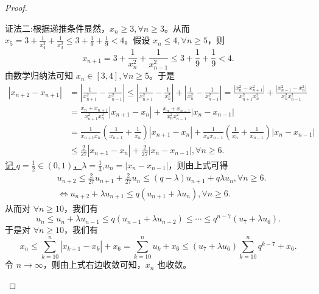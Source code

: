 \documentclass[../../main.tex]{subfiles}%
\begin{document}
\begin{proof}
\begin{enumerate}
{\color{blue}证法二:}根据递推条件显然，\(x_n\geqslant 3,\forall n\geqslant 3\)。从而 \(x_5 = 3+\frac{1}{x_{4}^{2}}+\frac{1}{x_{3}^{2}}\leqslant 3+\frac{1}{9}+\frac{1}{9}<4\)。假设 \(x_n\leqslant 4,\forall n\geqslant 5\)，则
\[
x_{n + 1}=3+\frac{1}{x_{n}^{2}}+\frac{1}{x_{n - 1}^{2}}\leqslant 3+\frac{1}{9}+\frac{1}{9}<4.
\]
由数学归纳法可知 \(x_n\in [3,4],\forall n\geqslant 5\)。于是
\begin{align*}
\left| x_{n+2}-x_{n+1} \right|&=\left| \frac{1}{x_{n+1}^{2}}-\frac{1}{x_{n-1}^{2}} \right|\leqslant \left| \frac{1}{x_{n+1}^{2}}-\frac{1}{x_{n}^{2}} \right|+\left| \frac{1}{x_{n}^{2}}-\frac{1}{x_{n-1}^{2}} \right|=\frac{\left| x_{n}^{2}-x_{n+1}^{2} \right|}{x_{n+1}^{2}x_{n}^{2}}+\frac{\left| x_{n-1}^{2}-x_{n}^{2} \right|}{x_{n}^{2}x_{n-1}^{2}}
\\
&=\frac{x_n+x_{n+1}}{x_{n+1}^{2}x_{n}^{2}}\left| x_{n+1}-x_n \right|+\frac{x_n+x_{n-1}}{x_{n}^{2}x_{n-1}^{2}}\left| x_n-x_{n-1} \right|
\\
&=\frac{1}{x_{n+1}x_n}\left( \frac{1}{x_{n+1}}+\frac{1}{x_n} \right) \left| x_{n+1}-x_n \right|+\frac{1}{x_nx_{n-1}}\left( \frac{1}{x_n}+\frac{1}{x_{n-1}} \right) \left| x_n-x_{n-1} \right|
\\
&\leqslant \frac{2}{27}\left| x_{n+1}-x_n \right|+\frac{2}{27}\left| x_n-x_{n-1} \right|,\forall n\geqslant 6.      
\end{align*}
\hyperlink{取q,lambda的原因}{记 \(q = \frac{1}{2}\in(0,1)\)，\(\lambda=\frac{1}{3}\)},\(u_n = |x_n - x_{n - 1}|\)，则由上式可得
\begin{align*}
&u_{n + 2}\leqslant \frac{2}{27}u_{n + 1}+\frac{2}{27}u_n
\leqslant (q - \lambda)u_{n + 1}+q\lambda u_n,\forall n\geqslant 6.\\
&\iff u_{n + 2}+\lambda u_{n + 1}\leqslant q(u_{n + 1}+\lambda u_n),\forall n\geqslant 6.
\end{align*}
从而对 \(\forall n\geqslant 10\)，我们有
\[
u_n\leqslant u_n+\lambda u_{n - 1}\leqslant q(u_{n - 1}+\lambda u_{n - 2})\leqslant\cdots\leqslant q^{n - 7}(u_7+\lambda u_6).
\]
于是对 \(\forall n\geqslant 10\)，我们有
\[
x_n\leqslant \sum_{k = 10}^n|x_{k + 1}-x_k|+x_6=\sum_{k = 10}^n u_k+x_6\leqslant (u_7+\lambda u_6)\sum_{k = 10}^n q^{k - 7}+x_6.
\]
令 \(n\rightarrow\infty\)，则由上式右边收敛可知，\(x_n\) 也收敛。
\end{enumerate}    
\end{proof}
\end{document}
